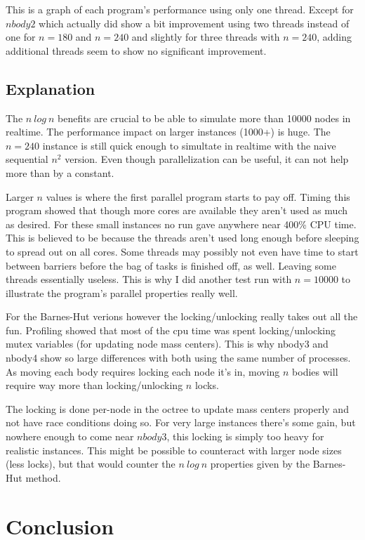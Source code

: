\documentclass[a4paper] {article}
\begin{document}
This is a graph of each program's performance using only one thread. Except for $nbody2$ which actually did show a bit improvement using two threads instead of one for $n=180$ and $n=240$ and slightly for three threads with $n=240$, adding additional threads seem to show no significant improvement.

\subsection{Explanation}

The $n\ log\ n$ benefits are crucial to be able to simulate more than 10000 nodes in realtime. The performance impact on larger instances (1000+) is huge. The $n=240$ instance is still quick enough to simultate in realtime with the naive sequential $n^2$ version. Even though parallelization can be useful, it can not help more than by a constant.

Larger $n$ values is where the first parallel program starts to pay off. Timing this program showed that though more cores are available they aren't used as much as desired. For these small instances no run gave anywhere near 400\% CPU time. This is believed to be because the threads aren't used long enough before sleeping to spread out on all cores. Some threads may possibly not even have time to start between barriers before the bag of tasks is finished off, as well. Leaving some threads essentially useless. This is why I did another test run with $n=10000$ to illustrate the program's parallel properties really well.

For the Barnes-Hut verions however the locking/unlocking really takes out all the fun. Profiling showed that most of the cpu time was spent locking/unlocking mutex variables (for updating node mass centers). This is why nbody3 and nbody4 show so large differences with both using the same number of processes. As moving each body requires locking each node it's in, moving $n$ bodies will require way more than locking/unlocking $n$ locks.

The locking is done per-node in the octree to update mass centers properly and not have race conditions doing so. For very large instances there's some gain, but nowhere enough to come near $nbody3$, this locking is simply too heavy for realistic instances. This might be possible to counteract with larger node sizes (less locks), but that would counter the $n\ log\ n$ properties given by the Barnes-Hut method.

\section{Conclusion}
\end{document}
